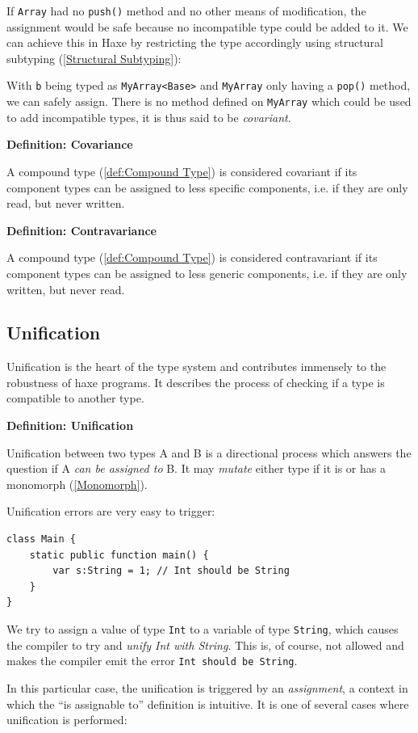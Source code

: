 \documentclass{article}
\newcommand{\type}[1]{\texttt{#1}}
\newcommand{\expr}[1]{\texttt{#1}}
\newenvironment{myshaded}
  {\def\FrameCommand{\fboxsep=\topsep\colorbox{bgcolor}}%
  \MakeFramed {\advance\hsize-\width \FrameRestore}}%
 {\endMakeFramed}
\newcommand{\define}[3][Definition]
	{\begin{myshaded}\noindent\textbf{#1: #2}\par\nobreak\noindent\ignorespaces#3\label{def:#2}\end{myshaded}}
\newcommand{\tref}[2]{#1 (\ref{#2})}
\newcommand{\haxe}[2][]{%
}
\begin{document}
If \type{Array} had no \expr{push()} method and no other means of modification, the assignment would be safe because no incompatible type could be added to it. We can achieve this in Haxe by restricting the type accordingly using \tref{structural subtyping}{Structural Subtyping}:

\haxe{assets/Variance3.hx}

With \expr{b} being typed as \type{MyArray<Base>} and \type{MyArray} only having a \expr{pop()} method, we can safely assign. There is no method defined on \type{MyArray} which could be used to add incompatible types, it is thus said to be \emph{covariant}.

\define{Covariance}{A \tref{compound type}{def:Compound Type} is considered covariant if its component types can be assigned to less specific components, i.e. if they are only read, but never written.}

\define{Contravariance}{A \tref{compound type}{def:Compound Type} is considered contravariant if its component types can be assigned to less generic components, i.e. if they are only written, but never read.}




\subsection{Unification}
\label{Unification}

Unification is the heart of the type system and contributes immensely to the robustness of haxe programs. It describes the process of checking if a type is compatible to another type.

\define{Unification}{Unification between two types A and B is a directional process which answers the question if A \emph{can be assigned to} B. It may \emph{mutate} either type if it is or has a \tref{monomorph}{Monomorph}.}

Unification errors are very easy to trigger:

\begin{lstlisting}
class Main {
	static public function main() {
		var s:String = 1; // Int should be String
	}
}
\end{lstlisting}
We try to assign a value of type \type{Int} to a variable of type \type{String}, which causes the compiler to try and \emph{unify Int with String}. This is, of course, not allowed and makes the compiler emit the error \expr{Int should be String}.

In this particular case, the unification is triggered by an \emph{assignment}, a context in which the ``is assignable to'' definition is intuitive. It is one of several cases where unification is performed:
\end{document}

